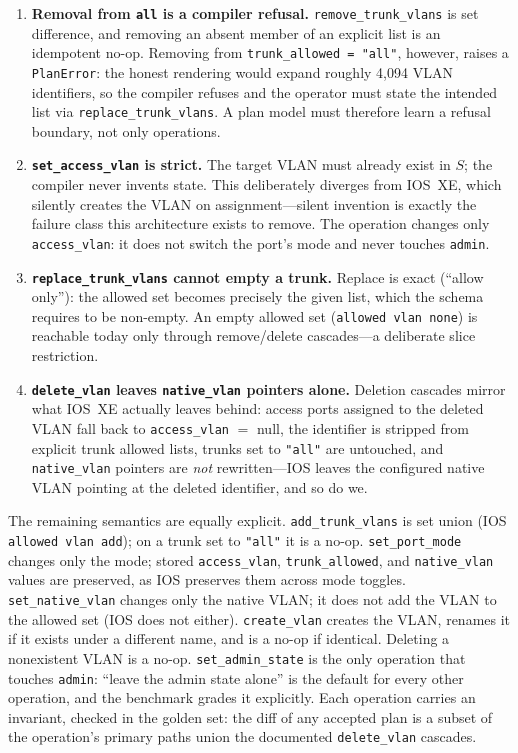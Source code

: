 \documentclass[conference]{IEEEtran}
\begin{document}
\begin{enumerate}
\item \textbf{Removal from \texttt{all} is a compiler refusal.} \texttt{remove\_trunk\_vlans} is set difference, and removing an absent member of an explicit list is an idempotent no-op. Removing from \texttt{trunk\_allowed = "all"}, however, raises a \texttt{PlanError}: the honest rendering would expand roughly 4,094 VLAN identifiers, so the compiler refuses and the operator must state the intended list via \texttt{replace\_trunk\_vlans}. A plan model must therefore learn a refusal boundary, not only operations.
\item \textbf{\texttt{set\_access\_vlan} is strict.} The target VLAN must already exist in $S$; the compiler never invents state. This deliberately diverges from IOS~XE, which silently creates the VLAN on assignment---silent invention is exactly the failure class this architecture exists to remove. The operation changes only \texttt{access\_vlan}: it does not switch the port's mode and never touches \texttt{admin}.
\item \textbf{\texttt{replace\_trunk\_vlans} cannot empty a trunk.} Replace is exact (``allow only''): the allowed set becomes precisely the given list, which the schema requires to be non-empty. An empty allowed set (\texttt{allowed vlan none}) is reachable today only through remove/delete cascades---a deliberate slice restriction.
\item \textbf{\texttt{delete\_vlan} leaves \texttt{native\_vlan} pointers alone.} Deletion cascades mirror what IOS~XE actually leaves behind: access ports assigned to the deleted VLAN fall back to \texttt{access\_vlan} $=$ null, the identifier is stripped from explicit trunk allowed lists, trunks set to \texttt{"all"} are untouched, and \texttt{native\_vlan} pointers are \emph{not} rewritten---IOS leaves the configured native VLAN pointing at the deleted identifier, and so do we.
\end{enumerate}

The remaining semantics are equally explicit. \texttt{add\_trunk\_vlans} is set union (IOS \texttt{allowed vlan add}); on a trunk set to \texttt{"all"} it is a no-op. \texttt{set\_port\_mode} changes only the mode; stored \texttt{access\_vlan}, \texttt{trunk\_allowed}, and \texttt{native\_vlan} values are preserved, as IOS preserves them across mode toggles. \texttt{set\_native\_vlan} changes only the native VLAN; it does not add the VLAN to the allowed set (IOS does not either). \texttt{create\_vlan} creates the VLAN, renames it if it exists under a different name, and is a no-op if identical. Deleting a nonexistent VLAN is a no-op. \texttt{set\_admin\_state} is the only operation that touches \texttt{admin}: ``leave the admin state alone'' is the default for every other operation, and the benchmark grades it explicitly. Each operation carries an invariant, checked in the golden set: the diff of any accepted plan is a subset of the operation's primary paths union the documented \texttt{delete\_vlan} cascades.
\end{document}
